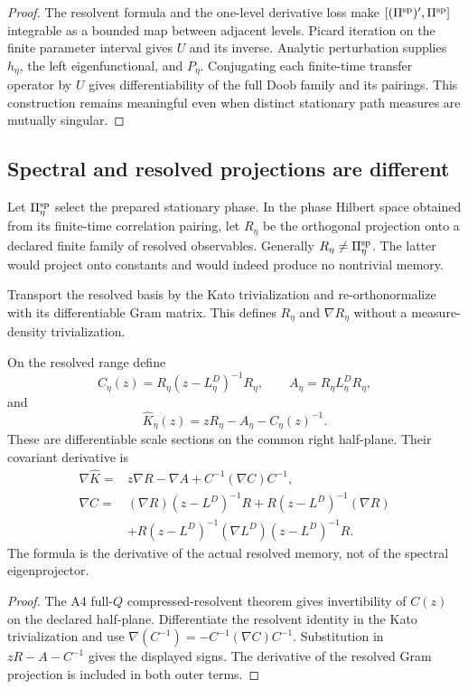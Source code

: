\begin{proof}
The resolvent formula and the one-level derivative loss make
$[(\Pi^{\rm sp})',\Pi^{\rm sp}]$ integrable as a bounded map between adjacent
levels.  Picard iteration on the finite parameter interval gives $U$ and its
inverse.  Analytic perturbation supplies $h_\eta$, the left
eigenfunctional, and $P_\eta$.  Conjugating each finite-time
transfer operator by $U$ gives differentiability of the full Doob family and
its pairings.  This construction remains meaningful even when distinct
stationary path measures are mutually singular.
\end{proof}

\subsection{Spectral and resolved projections are different}

Let $\Pi_\eta^{\rm sp}$ select the prepared stationary phase.  In
the phase Hilbert space obtained from its finite-time correlation pairing, let
$R_\eta$ be the orthogonal projection onto a declared finite family
of resolved observables.  Generally
$R_\eta\ne\Pi_\eta^{\rm sp}$.  The latter would project
onto constants and would indeed produce no nontrivial memory.

Transport the resolved basis by the Kato trivialization and re-orthonormalize
with its differentiable Gram matrix.  This defines $R_\eta$ and
$\nabla R_\eta$ without a measure-density trivialization.

\begin{theorem}
\label{thm:r9-c2-memory}
On the resolved range define
\[
 C_\eta(z)
 =R_\eta(z-L_\eta^D)^{-1}R_\eta,
 \qquad
 A_\eta=R_\eta L_\eta^D R_\eta,
\]
and
\[
 \widehat K_\eta(z)
 =zR_\eta-A_\eta-C_\eta(z)^{-1}.
\]
These are differentiable scale sections on the common right half-plane.  Their
covariant derivative is
\[
\begin{aligned}
 \nabla\widehat K
 ={}&z\nabla R-\nabla A
 +C^{-1}(\nabla C)C^{-1},\\
 \nabla C
 ={}&(\nabla R)(z-L^D)^{-1}R
 +R(z-L^D)^{-1}(\nabla R)\\
 &+R(z-L^D)^{-1}(\nabla L^D)(z-L^D)^{-1}R.
\end{aligned}
\]
The formula is the derivative of the actual resolved memory, not of the
spectral eigenprojector.
\end{theorem}

\begin{proof}
The A4 full-$Q$ compressed-resolvent theorem gives invertibility of $C(z)$ on
the declared half-plane.  Differentiate the resolvent identity in the Kato
trivialization and use
$\nabla(C^{-1})=-C^{-1}(\nabla C)C^{-1}$.  Substitution in
$zR-A-C^{-1}$ gives the displayed signs.  The derivative of the resolved Gram
projection is included in both outer terms.
\end{proof}

